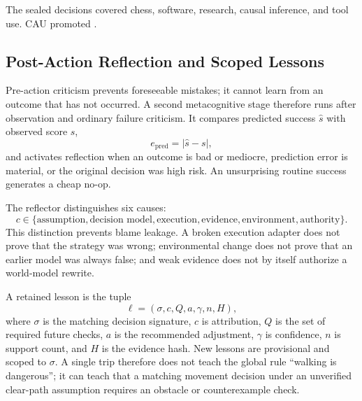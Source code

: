 The sealed decisions covered chess, software, research, causal inference, and
tool use.  CAU promoted
.

\subsection{Post-Action Reflection and Scoped Lessons}
\label{subsec:aion-post-action-reflection}

Pre-action criticism prevents foreseeable mistakes; it cannot learn from an
outcome that has not occurred.  A second metacognitive stage therefore runs
after observation and ordinary failure criticism.  It compares predicted
success $\hat{s}$ with observed score $s$,
\begin{equation}
e_{\mathrm{pred}}=|\hat{s}-s|,
\end{equation}
and activates reflection when an outcome is bad or mediocre, prediction error
is material, or the original decision was high risk.  An unsurprising routine
success generates a cheap no-op.

The reflector distinguishes six causes:
\begin{equation}
c\in\{\text{assumption},\text{decision model},\text{execution},
\text{evidence},\text{environment},\text{authority}\}.
\label{eq:reflection-attribution}
\end{equation}
This distinction prevents blame leakage.  A broken execution adapter does not
prove that the strategy was wrong; environmental change does not prove that an
earlier model was always false; and weak evidence does not by itself authorize
a world-model rewrite.

A retained lesson is the tuple
\begin{equation}
\ell=(\sigma,c,Q,a,\gamma,n,H),
\end{equation}
where $\sigma$ is the matching decision signature, $c$ is attribution, $Q$ is
the set of required future checks, $a$ is the recommended adjustment,
$\gamma$ is confidence, $n$ is support count, and $H$ is the evidence hash.
New lessons are provisional and scoped to $\sigma$.  A single trip therefore
does not teach the global rule ``walking is dangerous''; it can teach that a
matching movement decision under an unverified clear-path assumption requires
an obstacle or counterexample check.

